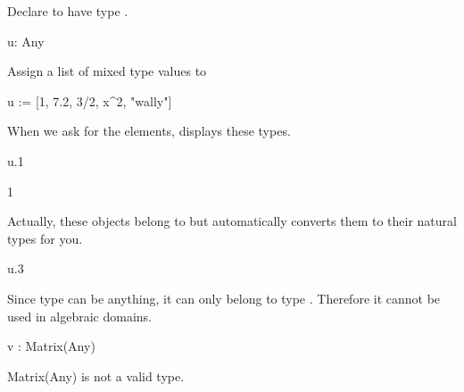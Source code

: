 \begin{xtc}
\begin{xtccomment}
Declare  to have type .
\end{xtccomment}
\begin{spadsrc}
u: Any
\end{spadsrc}
\end{xtc}
\begin{xtc}
\begin{xtccomment}
Assign a list of mixed type values to 
\end{xtccomment}
\begin{spadsrc}
u := [1, 7.2, 3/2, x^2, "wally"]
\end{spadsrc}
\begin{TeXOutput}
\begin{fricasmath}{2}
%
\end{fricasmath}
\end{TeXOutput}
\end{xtc}
\begin{xtc}
\begin{xtccomment}
When we ask for the elements, \Language{} displays these types.
\end{xtccomment}
\begin{spadsrc}
u.1 
\end{spadsrc}
\begin{TeXOutput}
\begin{fricasmath}{3}
1%
\end{fricasmath}
\end{TeXOutput}
\end{xtc}
\begin{xtc}
\begin{xtccomment}
Actually, these objects belong to  but \Language{}
automatically converts them to their natural types for you.
\end{xtccomment}
\begin{spadsrc}
u.3 
\end{spadsrc}
\begin{TeXOutput}
\begin{fricasmath}{4}
%
\end{fricasmath}
\end{TeXOutput}
\end{xtc}
\begin{xtc}
\begin{xtccomment}
Since type  can be anything,
it can only belong to type .
Therefore it cannot be used in algebraic domains.
\end{xtccomment}
\begin{spadsrc}
v : Matrix(Any)
\end{spadsrc}
\begin{MessageOutput}
   Matrix(Any) is not a valid type.
\end{MessageOutput}
\end{xtc}

